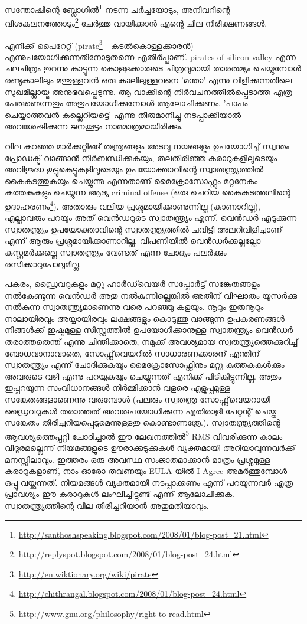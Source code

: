 \vskip 2pt

സന്തോഷിന്റെ ബ്ലോഗില്‍\footnote{\url{http://santhoshspeaking.blogspot.com/2008/01/blog-post_21.html}} നടന്ന ചര്‍ച്ചയോടും, 
അനിവറിന്റെ വിശകലനത്തോടും\footnote{\url{http://replyspot.blogspot.com/2008/01/blog-post_24.html}} ചേര്‍ത്തു വായിക്കാന്‍ 
എന്റെ ചില നിരീക്ഷണങ്ങള്‍.

എനിക്ക് പൈറേറ്റ് (pirate\footnote{\url{http://en.wiktionary.org/wiki/pirate}} - കടല്‍കൊള്ളക്കാരന്‍) 
എന്നുപയോഗിക്കുന്നതിനോടുതന്നെ എതിര്‍പ്പാണ്. pirates of silicon valley എന്ന ചലചിത്രം തുറന്നു കാട്ടുന്ന 
കൊള്ളക്കാരുടെ ചിത്രവുമായി താരതമ്യം ചെയ്യുമ്പോള്‍ രണ്ടുകാലിലും മന്തുള്ളവന്‍ ഒരു കാലിലുള്ളവനെ 'മന്താ' 
എന്നു വിളിക്കുന്നതിലെ സുഖമില്ലായ്മ അനുഭവപ്പെടുന്നു. ആ വാക്കിന്റെ നിര്‍വചനത്തില്‍‌പ്പെടാത്ത എത്ര പേരുണ്ടെന്നതും 
അതുപയോഗിക്കുമ്പോള്‍ ആലോചിക്കണം. 'പാപം ചെയ്യാത്തവന്‍ കല്ലെറിയട്ടെ' എന്നു തീരുമാനിച്ചു നടപ്പാക്കിയാല്‍ 
അവശേഷിക്കുന്ന ജനക്കൂട്ടം നാമമാത്രമായിരിക്കും.

വില കുറഞ്ഞ മാര്‍ക്കറ്റിങ്ങ് തന്ത്രങ്ങളൂം അടവു നയങ്ങളൂം ഉപയോഗിച്ച് സ്വന്തം പ്രോഡക്ട് വാങ്ങാന്‍ നിര്‍ബന്ധിക്കുകയും,
തലതിരിഞ്ഞ കരാറുകളിലൂടെയും അവിശുദ്ധ കൂട്ടുകെട്ടുകളിലൂടെയും ഉപയോക്താവിന്റെ സ്വാതന്ത്ര്യത്തില്‍ കൈകടത്തുകയും 
ചെയ്യുന്നു എന്നതാണ് മൈക്രോസോഫ്റ്റും മറ്റനേകം കുത്തകകളും ചെയ്യുന്ന ആദ്യ criminal offense 
(ഒരു ചെറിയ കൈകടത്തലിന്റെ ഉദാഹരണം\footnote{\url{http://chithrangal.blogspot.com/2008/01/blog-post_24.html}}). 
അതാരും വലിയ പ്രശ്നമായിക്കാണുന്നില്ല (കാണാറില്ല), എല്ലാവരും പറയും അത് വെന്‍ഡറുടെ സ്വാതന്ത്ര്യം എന്ന്. 
വെന്‍ഡര്‍ എടുക്കുന്ന സ്വാതന്ത്ര്യം ഉപയോക്താവിന്റെ സ്വാതന്ത്ര്യത്തില്‍ ചവിട്ടി അലറിവിളിച്ചാണ് എന്ന് ആരും 
പ്രശ്നമായിക്കാണാറില്ല. വിപണിയില്‍ വെന്‍ഡര്‍ക്കല്ലല്ലോ കസ്റ്റമര്‍ക്കല്ലെ സ്വാതന്ത്ര്യം വേണ്ടത് എന്ന ചോദ്യം പലര്‍ക്കും 
രസിക്കാറുപോലുമില്ല.

പകരം, ഡ്രൈവറുകളും മറ്റു ഹാര്‍ഡ്‌വെയര്‍ സപ്പോര്‍ട്ട് സങ്കേതങ്ങളും നല്‍കേണ്ടുന്ന വെന്‍ഡര്‍ അതു നല്‍കുന്നില്ലെങ്കില്‍ അതിന് 
വിഘാതം യൂസര്‍ക്കു നല്‍കുന്ന സ്വാതന്ത്ര്യമാണെന്നു വരെ പറഞ്ഞു കളയും. നൂറും ഇരുനൂറും നാലായിരവും അയ്യായിരവും 
ലക്ഷങ്ങളും കൊടുത്തു വാങ്ങുന്ന ഉപകരണങ്ങള്‍ നിങ്ങള്‍ക്ക് ഇഷ്ടമുള്ള സിസ്റ്റത്തില്‍ ഉപയോഗിക്കാനുള്ള സ്വാതന്ത്ര്യം വെന്‍ഡര്‍ 
തരാത്തതെന്ത് എന്നു ചിന്തിക്കാതെ, നമുക്ക് അവശ്യമായ സ്വതന്ത്ര്യത്തെക്കുറിച്ച് ബോധവാനാവാതെ, സോഫ്റ്റ്‌വെയറില്‍ 
സാധാരണക്കാരന് എന്തിന് സ്വാതന്ത്ര്യം എന്ന് ചോദിക്കുകയും മൈക്രോസോഫ്റ്റിനും മറ്റു കുത്തകകള്‍ക്കും അവരുടെ വഴി 
എന്നു പറയുകയും ചെയ്യുന്നത് എനിക്ക് പിടികിട്ടുന്നില്ല. അതും ഇപ്പറയുന്ന സംവിധാനങ്ങള്‍ നിര്‍മ്മിക്കാന്‍ വളരെ 
എളുപ്പമുള്ള സങ്കേതങ്ങളാണെന്നു വരുമ്പോള്‍ (പലരും സ്വതന്ത്ര സോഫ്റ്റ്‌വെയറായി ഡ്രൈവറുകള്‍ തരാത്തത് അവരുപയോഗിക്കുന്ന 
എതിരാളി പേറ്റന്റ് ചെയ്ത സങ്കേതം തിരിച്ചറിയപ്പെടുമെന്നുള്ളതു കൊണ്ടാണത്രേ.). 
സ്വാതന്ത്ര്യത്തിന്റെ ആവശ്യത്തെപ്പറ്റി ചോദിച്ചാല്‍ ഈ ലേഖനത്തില്‍\footnote{\url{http://www.gnu.org/philosophy/right-to-read.html}} 
RMS വിവരിക്കുന്ന കാലം വിദൂരമല്ലെന്ന് നിയമങ്ങളുടെ ഊരാക്കുടുക്കുകള്‍ വ്യക്തമായി അറിയാവുന്നവര്‍ക്ക് മനസ്സിലാവും. 
ഇത്തരം ഒരു അവസ്ഥ സംജാതമാക്കാന്‍ മാത്രം പ്രശ്നമുള്ള കരാറുകളാണ്, നാം ഓരോ തവണയും EULA യില്‍ I Agree 
അമര്‍ത്തുമ്പോള്‍ ഒപ്പു വയ്ക്കുന്നത്. നിയമങ്ങള്‍ വ്യക്തമായി നടപ്പാക്കണം എന്ന് പറയുന്നവര്‍ എത്ര പ്രാവശ്യം ഈ കരാറുകള്‍ 
ലംഘിച്ചിട്ടുണ്ട് എന്ന് ആലോചിക്കുക. സ്വാതന്ത്ര്യത്തിന്റെ വില തിരിച്ചറിയാന്‍ അതുമതിയാവും.

